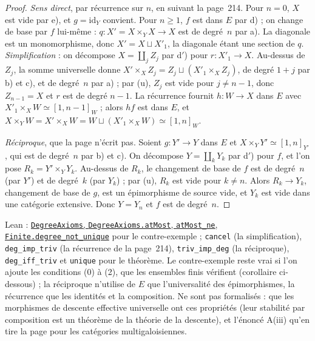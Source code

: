 \begin{proof}
\emph{Sens direct}, par récurrence sur $n$, en suivant la page~214. Pour $n = 0$, $X$ est vide par e), et $g = \mathrm{id}_Y$ convient. Pour $n \geq 1$, $f$ est dans $E$ par d) ; on change de base par $f$ lui-même : $q : X' = X \times_Y X \to X$ est de degré~$n$ par a). La diagonale est un monomorphisme, donc $X' = X \sqcup X'_1$, la diagonale étant une section de $q$. \emph{Simplification} : on décompose $X = \coprod_j Z_j$ par d$'$) pour $r : X'_1 \to X$. Au-dessus de $Z_j$, la somme universelle donne $X' \times_X Z_j = Z_j \sqcup (X'_1 \times_X Z_j)$, de degré $1 + j$ par b) et c), et de degré~$n$ par a) ; par (u), $Z_j$ est vide pour $j \neq n - 1$, donc $Z_{n-1} = X$ et $r$ est de degré $n - 1$. La récurrence fournit $h : W \to X$ dans $E$ avec $X'_1 \times_X W \simeq [1, n-1]_W$ ; alors $h f$ est dans $E$, et $X \times_Y W = X' \times_X W = W \sqcup (X'_1 \times_X W) \simeq [1, n]_W$.

\emph{Réciproque}, que la page n'écrit pas. Soient $g : Y' \to Y$ dans $E$ et $X \times_Y Y' \simeq [1, n]_{Y'}$, qui est de degré~$n$ par b) et c). On décompose $Y = \coprod_k Y_k$ par d$'$) pour $f$, et l'on pose $R_k = Y' \times_Y Y_k$. Au-dessus de $R_k$, le changement de base de $f$ est de degré~$n$ (par $Y'$) et de degré~$k$ (par $Y_k$) ; par (u), $R_k$ est vide pour $k \neq n$. Alors $R_k \to Y_k$, changement de base de $g$, est un épimorphisme de source vide, et $Y_k$ est vide dans une catégorie extensive. Donc $Y = Y_n$ et $f$ est de degré~$n$.
\end{proof}

\noindent Lean : \href{\leanblob/AlgebraicGeometry/Folder29.lean}{\texttt{DegreeAxioms}, \texttt{DegreeAxioms.\allowbreak{}atMost}, \texttt{atMost\_ne}, \texttt{Finite.\allowbreak{}degree\_not\_unique}} pour le contre-exemple ; \texttt{cancel} (la simplification), \texttt{deg\_imp\_triv} (la récurrence de la page~214), \texttt{triv\_imp\_deg} (la réciproque), \texttt{deg\_iff\_triv} et \texttt{unique} pour le théorème. Le contre-exemple reste vrai si l'on ajoute les conditions (0) à (2), que les ensembles finis vérifient (corollaire ci-dessous) ; la réciproque n'utilise de $E$ que l'universalité des épimorphismes, la récurrence que les identités et la composition. Ne sont pas formalisés : que les morphismes de descente effective universelle ont ces propriétés (leur stabilité par composition est un théorème de la théorie de la descente), et l'énoncé A(iii) qu'en tire la page pour les catégories multigaloisiennes.

